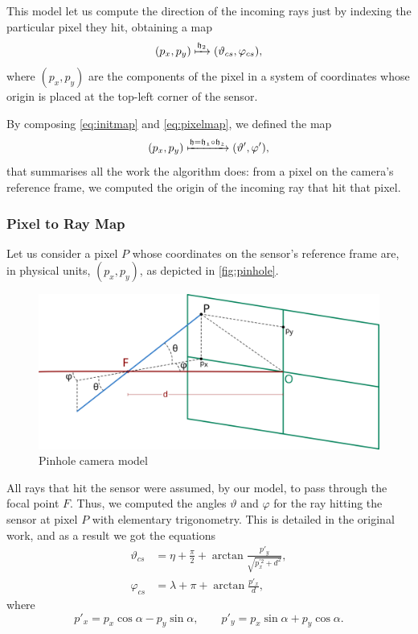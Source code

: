 This model let us compute the direction of the incoming rays just by indexing the particular pixel they hit, obtaining a map
\begin{equation}
\label{eq:pixelmap}
(p_x, p_y) \xmapsto{\mathfrak{h}_2} (\vartheta_{cs}, \varphi_{cs}),
\end{equation}
where $(p_x, p_y)$ are the components of the pixel in a system of coordinates whose origin is placed at the top-left corner of the sensor.

By composing \autoref{eq:initmap} and \autoref{eq:pixelmap}, we defined the map
\begin{equation}
(p_x, p_y) \xmapsto{\mathfrak{h} = \mathfrak{h_1}\circ\mathfrak{h_2}} (\vartheta', \varphi'),
\end{equation}
that summarises all the work the algorithm does: from a pixel on the camera's reference frame, we computed the origin of the incoming ray that hit that pixel.

\subsubsection*{Pixel to Ray Map}
\label{subcsec:pixeltoray}

Let us consider a pixel $P$ whose coordinates on the sensor's reference frame are, in physical units, $(p_x, p_y)$, as depicted in \autoref{fig:pinhole}.

\begin{figure}[bth]
	\myfloatalign
	\includegraphics[width=.8\linewidth]{gfx/pinhole.png}
	\caption[Pinhole camera model]{Pinhole camera model}
	\label{fig:pinhole}
\end{figure}

All rays that hit the sensor were assumed, by our model, to pass through the focal point $F$. Thus, we computed the angles $\vartheta$ and $\varphi$ for the ray hitting the sensor at pixel $P$ with elementary trigonometry. This is detailed in the original work, and as a result we got the equations
\begin{align}
\label{eq:pinhole1}
\vartheta_{cs} &= \eta + \frac{\pi}{2} + \arctan{\frac{p'_y}{\sqrt{p_x^{'2} + d^2}}}, \\
\label{eq:pinhole2}
\varphi_{cs} &= \lambda + \pi + \arctan{\frac{p'_x}{d}},
\end{align}
where
\[
p'_x = p_x\cos\alpha - p_y\sin\alpha, \qquad
p'_y = p_x\sin\alpha + p_y\cos\alpha.
\]


